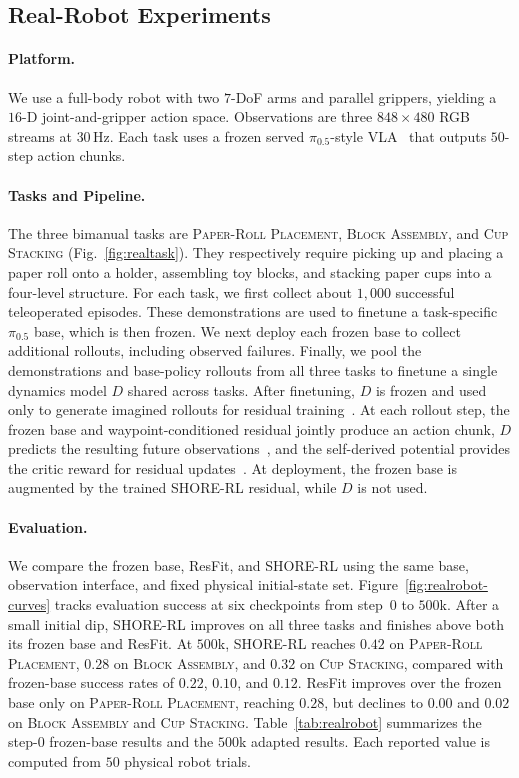 \documentclass[letterpaper]{article} %
\begin{document}
\subsection{Real-Robot Experiments}
\label{sec:exp-real}
\paragraph{Platform.}
We use a full-body robot with two $7$-DoF arms and parallel grippers, yielding a
$16$-D joint-and-gripper action space. Observations are three $848{\times}480$
RGB streams at $30$\,Hz. Each task uses a frozen served
$\pi_{0.5}$-style VLA~\cite{sima2026kai0,black2025pi05} that outputs $50$-step action chunks.

\paragraph{Tasks and Pipeline.}
The three bimanual tasks are \textsc{Paper-Roll Placement}, \textsc{Block
Assembly}, and \textsc{Cup Stacking} (Fig.~\ref{fig:realtask}). They
respectively require picking up and placing a paper roll onto a holder,
assembling toy blocks, and stacking paper cups into a four-level structure.
For each task,
we first collect about $1{,}000$ successful teleoperated episodes. These
demonstrations are used to finetune a task-specific $\pi_{0.5}$ base, which is
then frozen. We next deploy each frozen base to collect additional rollouts,
including observed failures. Finally, we pool the demonstrations and
base-policy rollouts from all three tasks to finetune a single dynamics model
$D$ shared across tasks. After
finetuning, $D$ is frozen and used only to generate imagined rollouts for
residual training~\cite{wu2023daydreamer}. At each rollout step, the frozen base and
waypoint-conditioned residual jointly produce an action chunk, $D$ predicts
the resulting future observations~\cite{yang2026rise}, and the self-derived potential provides the
critic reward for residual updates~\cite{escontrela2023viper}. At deployment, the frozen base is
augmented by the trained SHORE-RL residual, while $D$ is not used.

\paragraph{Evaluation.}
We compare the frozen base, ResFit, and SHORE-RL using the same base,
observation interface, and fixed physical initial-state set.
Figure~\ref{fig:realrobot-curves} tracks evaluation success at six checkpoints
from step~$0$ to $500$k. After a small initial dip, SHORE-RL improves on all
three tasks and finishes above both its frozen base and ResFit. At $500$k,
SHORE-RL reaches $0.42$ on \textsc{Paper-Roll Placement}, $0.28$ on
\textsc{Block Assembly}, and $0.32$ on \textsc{Cup Stacking}, compared with
frozen-base success rates of $0.22$, $0.10$, and $0.12$. ResFit improves over the
frozen base only on \textsc{Paper-Roll Placement}, reaching $0.28$, but declines
to $0.00$ and $0.02$ on \textsc{Block Assembly} and \textsc{Cup Stacking}.
Table~\ref{tab:realrobot} summarizes the step-$0$ frozen-base results and the
$500$k adapted results. Each reported value is computed from $50$ physical
robot trials.
\end{document}
